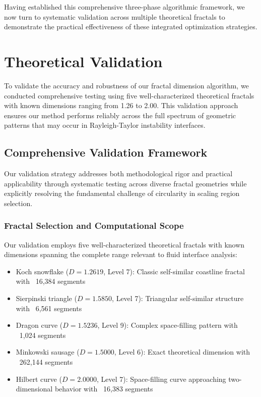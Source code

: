 \documentclass[preprint,12pt]{elsarticle}
\def\textbf#1{#1}%
\begin{document}
Having established this comprehensive three-phase algorithmic framework, we now turn to systematic validation across multiple theoretical fractals to demonstrate the practical effectiveness of these integrated optimization strategies.

\section{Theoretical Validation}

To validate the accuracy and robustness of our fractal dimension algorithm, we conducted comprehensive testing using five well-characterized theoretical fractals with known dimensions ranging from 1.26 to 2.00. This validation approach ensures our method performs reliably across the full spectrum of geometric patterns that may occur in Rayleigh-Taylor instability interfaces.

\subsection{Comprehensive Validation Framework}
\label{subsec:validation_framework}

Our validation strategy addresses both methodological rigor and practical applicability through systematic testing across diverse fractal geometries while explicitly resolving the fundamental challenge of circularity in scaling region selection.

\subsubsection{Fractal Selection and Computational Scope}

Our validation employs five well-characterized theoretical fractals with known dimensions spanning the complete range relevant to fluid interface analysis:

\begin{itemize}
\item \textbf{Koch snowflake} ($D = 1.2619$, Level 7): Classic self-similar coastline fractal with ~16,384 segments
\item \textbf{Sierpinski triangle} ($D = 1.5850$, Level 7): Triangular self-similar structure with ~6,561 segments
\item \textbf{Dragon curve} ($D = 1.5236$, Level 9): Complex space-filling pattern with ~1,024 segments
\item \textbf{Minkowski sausage} ($D = 1.5000$, Level 6): Exact theoretical dimension with ~262,144 segments
\item \textbf{Hilbert curve} ($D = 2.0000$, Level 7): Space-filling curve approaching two-dimensional behavior with ~16,383 segments
\end{itemize}
\end{document}
